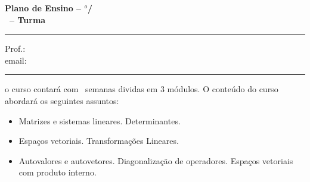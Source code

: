 \documentclass[12pt]{exam}
\begin{document}
\extraheadheight{0.7in}
\firstpageheadrule
\runningheadrule
{}

\extrafootheight{.5in}
\footrule
{}
\cfoot{}

\begin{center}
{\large\bf Plano de Ensino -- \semestre$^{o}$/\ano} \\
{\large\bf \disciplina\ -- Turma \turma}\\
\end{center}
\hrule

\begin{flushleft}
  Prof.: \nome\\
  email: \href{mailto:{\email}}{\email}
  \end{flushleft}
  \hrule
  \bigskip \bigskip
\vspace{0.25cm}
 o curso contará com \numerosemanas\ semanas dividas em 3 módulos. O conteúdo do curso abordará os seguintes assuntos:
\begin{itemize}
    \item Matrizes e sistemas lineares. Determinantes.

    \item Espaços vetoriais. Transformações Lineares.

    \item Autovalores e autovetores. Diagonalização de operadores. Espaços vetoriais com produto interno.

\end{itemize}
\end{document}
